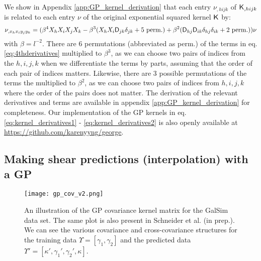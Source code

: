 We show in Appendix \ref{app:GP_kernel_derivation} 
that each entry $\nu_{,hijk}$ of $\mathsf{K}_{,hijk}$ is
related to each entry $\nu$ of the original exponential squared kernel
$\mathsf{K}$ by:
\begin{equation}
\nu_{,x_h x_i y_j y_k} = (\beta^4 X_h X_i X_j X_k -
\beta^3 (X_h X_i \mathsf{D}_{jk} \delta_{jk} + 5~{\rm perm.}) + \beta^2
(\mathsf{D}_{hj} \mathsf{D}_{ik}\delta_{hj}\delta_{ik} + 2~{\rm perm.})) \nu
\label{eq:4thderivatives}
\end{equation}
with $\beta = l^{-2}$. There are 6 permutations (abbreviated as perm.) of the terms in
eq. \ref{eq:4thderivatives}
multiplied to $\beta^3$, as we can choose two pairs of indices from the $h,i,j,k$ 
when we differentiate the terms by parts, assuming that the order of each
pair of indices matters. 
Likewise, there are 3 possible permutations of
the terms the multiplied to $\beta^2$, as we can choose two pairs of indices from
$h, i, j, k$ where the order of the pairs does not matter.
The derivation of the relevant derivatives and terms are available 
in appendix \ref{app:GP_kernel_derivation} for completeness. 
Our implementation of the GP kernels in eq. \ref{eq:kernel_derivatives1} - 
\ref{eq:kernel_derivatives2} is also openly available at
\href{https://github.com/karenyyng/george}{https://github.com/karenyyng/george}.


\subsection{Making shear predictions (interpolation) with a GP}


\begin{figure}
	\centering
	\texttt{[image: gp\_cov\_v2.png]}
	\caption{An illustration of the GP covariance kernel matrix for the {\sc GalSim} data set.
		The same plot is also present in Schneider et al. (in prep.). We can see the various covariance
		and cross-covariance
		structures for the training data $\Upsilon = [\gamma_1, \gamma_2]$
		and the predicted data $\Upsilon' = [\kappa', \gamma_1', \gamma_2',
		\kappa]$.
		\label{fig:GP_kernel_vis}}
\end{figure}

